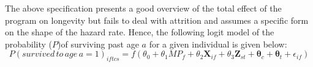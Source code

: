 The above specification presents a good overview of the total effect of the program on longevity but fails to deal with attrition and assumes a specific form on the shape of the hazard rate. Hence, the following logit model of the probability ($P$)of surviving past age $a$ for a given individual is given below:
$$
P(survived\,to\,age\,a=1)_{iftcs} = f(\theta_0 + \theta_1MP_f + \theta_2\mathbf{X}_{if} + \theta_3\mathbf{Z}_{st} + \mathbf{\theta}_c + \mathbf{\theta}_t + \epsilon_{if})
$$